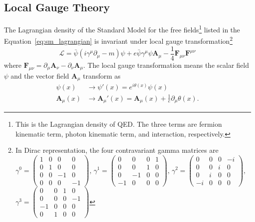 
\subsection{Local Gauge Theory}
\label{subsec:sm_gauge_theory}
The Lagrangian density of the Standard Model for the free fields\footnote{This is the Lagrangian density of QED. The three terms are fermion kinematic term, photon kinematic term, and interaction, respectively.} listed in the Equation~\ref{eq:sm_lagrangian} is invariant under local gauge transformation\footnote{In Dirac representation, the four contravariant gamma matrices are $\gamma^{0} = \left(\begin{matrix}1 & 0 & 0 & 0\\0 & 1 & 0 & 0\\0 & 0 & -1 & 0\\0 & 0 & 0 & -1\end{matrix}\right)$, $\gamma^{1} = \left(\begin{matrix}0 & 0 & 0 & 1\\0 & 0 & 1 & 0\\0 & -1 & 0 & 0\\-1 & 0 & 0 & 0\end{matrix}\right)$, $\gamma^{2} = \left(\begin{matrix}0 & 0 & 0 & -i\\0 & 0 & i & 0\\0 & i & 0 & 0\\-i & 0 & 0 & 0\end{matrix}\right)$, $\gamma^{3} = \left(\begin{matrix}0 & 0 & 1 & 0\\0 & 0 & 0 & -1\\-1 & 0 & 0 & 0\\0 & 1 & 0 & 0\end{matrix}\right)$}
%
\begin{equation}
\mathcal{L} = \bar{\psi}(i\gamma^{\mu}\partial_{\mu} - m)\psi + e\bar{\psi}\gamma^{\mu}\psi\bm{A}_{\mu} - \frac{1}{4}\bm{F}_{\mu\nu}\bm{F}^{\mu\nu}
\label{eq:sm_lagrangian}
\end{equation}
%
where $\bm{F}_{\mu\nu} = \partial_{\mu}\bm{A}_{\nu} - \partial_{\nu}\bm{A}_{\mu}$.
The local gauge transformation means the scalar field $\psi$ and the vector field $\bm{A}_{\mu}$ transform as
%
\begin{align}
\psi(x) & \rightarrow \psi'(x) = e^{i\theta(x)}\psi(x)\\
\bm{A}_{\mu}(x) & \rightarrow \bm{A}_{\mu}'(x) = \bm{A}_{\mu}(x) + \frac{1}{e}\partial_{\mu}\theta(x).
\label{eq:sm_gauge_transformation}
\end{align}
